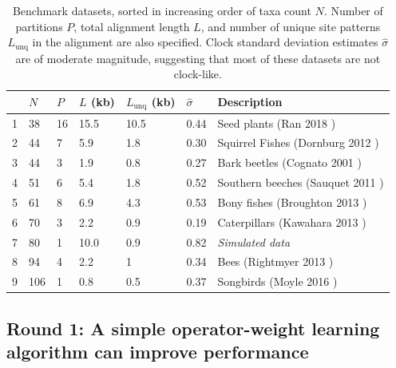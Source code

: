 \documentclass[10pt,letterpaper]{article}
\begin{document}
\begin{table}[h!]
\centering
\begin{tabular}{l l l l l l l} 
  & $N$ & $P$ & $L$ (kb) & $L_\text{unq}$ (kb) & $\hat{\sigma}$ & \textbf{Description} \\
  \hline
 
 
 1  &  38  &  16  &  15.5  &  10.5 &  0.44 &  Seed plants (Ran 2018 \cite{Ran_2018}) \\ 

2  &  44  &  7  &  5.9  &  1.8& 0.30 &  Squirrel Fishes (Dornburg 2012 \cite{Dornburg_2012}) \\ 

3  &  44  &  3  &  1.9  &  0.8& 0.27  &  Bark beetles (Cognato 2001 \cite{Cognato_2001}) \\ 

4  &  51  &  6  &  5.4  &  1.8 & 0.52 &  Southern beeches (Sauquet 2011 \cite{Sauquet_2011}) \\ 

5  &  61  &  8  &  6.9  &  4.3 & 0.53 &  Bony fishes (Broughton 2013 \cite{Broughton_2013}) \\ 

6  &  70  &  3  &  2.2  &  0.9  & 0.19 &  Caterpillars (Kawahara 2013 \cite{Kawahara_2013}) \\ 

7  &  80  &  1 &  10.0  &  0.9 & 0.82 &  \textit{Simulated data}  \\ 

8  &  94  &  4  &  2.2  &  1 & 0.34 &  Bees (Rightmyer 2013 \cite{Rightmyer_2013}) \\ 

9  &  106  &  1  &  0.8  &  0.5 & 0.37 &  Songbirds (Moyle 2016 \cite{Moyle_2016}) \\ 



\end{tabular}
\caption{Benchmark datasets, sorted in increasing order of taxa count $N$. Number of partitions $P$, total alignment length $L$, and number of unique site patterns $L_\text{unq}$ in the alignment are also specified.
Clock standard deviation estimates $\hat\sigma$ are of moderate magnitude, suggesting that most of these datasets are not clock-like.
}
\label{table:datasets}
\end{table}


\clearpage
\subsection*{Round 1: A simple operator-weight learning algorithm can improve performance}
\end{document}
